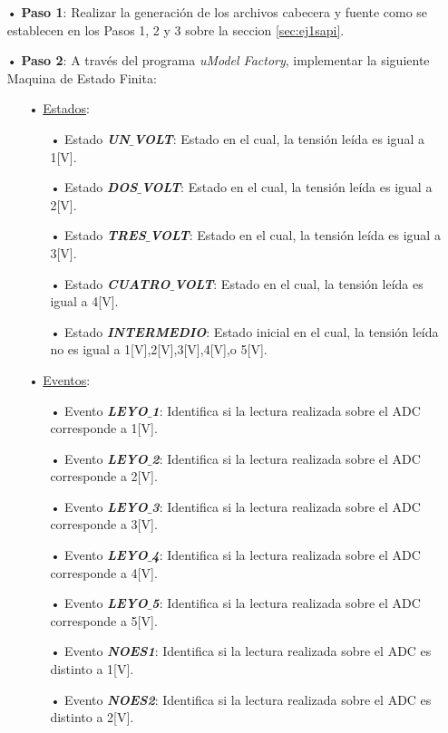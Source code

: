 \documentclass[12pt,letterpaper]{article}
\begin{document}
\begin{enumerate}
\item[•]\textbf{Paso 1}: Realizar la generación de los archivos cabecera y fuente como se establecen en los Pasos 1, 2 y 3 sobre la seccion \ref{sec:ej1sapi}.

\item[•]\textbf{Paso 2}: A través del programa \textit{uModel Factory}, implementar la siguiente Maquina de Estado Finita:

\begin{enumerate}
\item[•]\underline{Estados}:
\begin{enumerate}
\item[•]Estado \textit{\textbf{UN$\_$VOLT}}: Estado en el cual, la tensión leída es igual a 1[V].
\item[•]Estado \textit{\textbf{DOS$\_$VOLT}}: Estado en el cual, la tensión leída es igual a 2[V].
\item[•]Estado \textit{\textbf{TRES$\_$VOLT}}: Estado en el cual, la tensión leída es igual a 3[V].
\item[•]Estado \textit{\textbf{CUATRO$\_$VOLT}}: Estado en el cual, la tensión leída es igual a 4[V].
\item[•]Estado \textit{\textbf{INTERMEDIO}}: Estado inicial en el cual, la tensión leída no es igual a 1[V],2[V],3[V],4[V],o 5[V].
\end{enumerate}
\item[•]\underline{Eventos}:
\begin{enumerate}
\item[•]Evento \textit{\textbf{LEYO$\_$1}}: Identifica si la lectura realizada sobre el ADC corresponde a 1[V].
\item[•]Evento \textit{\textbf{LEYO$\_$2}}: Identifica si la lectura realizada sobre el ADC corresponde a 2[V].
\item[•]Evento \textit{\textbf{LEYO$\_$3}}: Identifica si la lectura realizada sobre el ADC corresponde a 3[V].
\item[•]Evento \textit{\textbf{LEYO$\_$4}}: Identifica si la lectura realizada sobre el ADC corresponde a 4[V].
\item[•]Evento \textit{\textbf{LEYO$\_$5}}: Identifica si la lectura realizada sobre el ADC corresponde a 5[V].
\item[•]Evento \textit{\textbf{NOES1}}: Identifica si la lectura realizada sobre el ADC es distinto a 1[V].
\item[•]Evento \textit{\textbf{NOES2}}: Identifica si la lectura realizada sobre el ADC es distinto a 2[V].

\end{enumerate}
\end{enumerate}
\end{enumerate}
\end{document}
